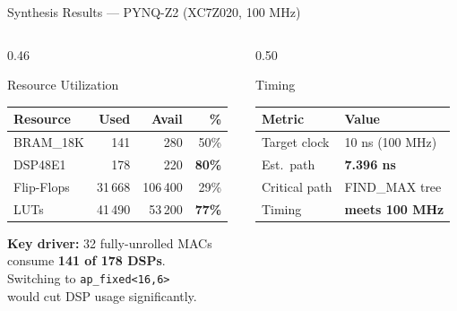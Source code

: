 \documentclass[aspectratio=169, 10pt]{beamer}
\newcommand{\good}[1]{{\color{GoodGrn}\textbf{#1}}}
\newcommand{\warn}[1]{{\color{WarnRed}\textbf{#1}}}
\begin{document}
\begin{frame}{Synthesis Results --- PYNQ-Z2 (XC7Z020, 100 MHz)}
  \begin{columns}[T]
    \begin{column}{0.46\textwidth}
      \begin{block}{Resource Utilization}
        \vspace{2pt}
        \begin{tabular}{lrrr}
          \toprule
          Resource    & Used    & Avail    & \%  \\
          \midrule
          BRAM\_18K   & 141     & 280      & 50\% \\
          DSP48E1     & 178     & 220      & \warn{80\%} \\
          Flip-Flops  & 31\,668 & 106\,400 & 29\% \\
          LUTs        & 41\,490 &  53\,200 & \warn{77\%} \\
          \bottomrule
        \end{tabular}
        \vspace{2pt}
      \end{block}

      \vspace{0.25cm}
      \textbf{Key driver:} 32 fully-unrolled MACs\\
      consume \textbf{141 of 178 DSPs}.\\[4pt]
      Switching to \texttt{ap\_fixed<16,6>}\\
      would cut DSP usage significantly.
    \end{column}
    \begin{column}{0.50\textwidth}
      \begin{block}{Timing}
        \vspace{2pt}
        \begin{tabular}{ll}
          \toprule
          Metric        & Value \\
          \midrule
          Target clock   & 10 ns (100 MHz) \\
          Est.\ path     & \good{7.396 ns}  \\
          Critical path  & FIND\_MAX tree   \\
          Timing         & \good{meets 100 MHz} \\
          \bottomrule
        \end{tabular}
        \vspace{2pt}
      \end{block}


\end{column}
\end{columns}
\end{frame}
\end{document}
